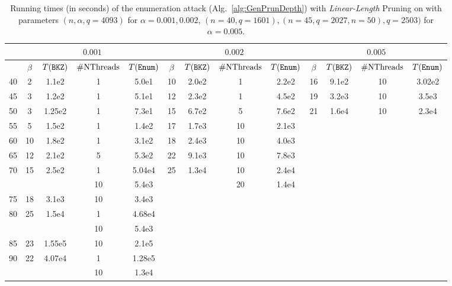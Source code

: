 \thispagestyle{empty} %
\begin{landscape}
\begin{table}
	\centering
	\begin{tabular}{|c|c|c|c|c|c|c|c|c|c|c|c||c|}
	
	\hline 
	\diagbox{$n$}{$\alpha$} & \multicolumn{4}{c|}{$0.001$} & \multicolumn{4}{c|}{$0.002$} & \multicolumn{4}{c|}{$0.005$} \\ \hline
	& $\beta$ & $T(\texttt{BKZ})$ & $\mathrm{\#NThreads}$ & $T(\texttt{Enum})$ & $\beta$ & $T(\texttt{BKZ})$ & $\mathrm{\#NThreads}$ & $T(\texttt{Enum})$ & $\beta$ & $T(\texttt{BKZ})$ & $\mathrm{\#NThreads}$ & $T(\texttt{Enum})$ \\ \hline
	40 & 2 & 1.1e2 & 1 & 5.0e1 & 
	     10& 2.0e2 & 1 & 2.2e2 & 
	     16& 9.1e2 & 10 & 3.02e2 \\ \hline
	45 & 3 & 1.2e2& 1 & 5.1e1 &
	     12 & 2.3e2& 1& 4.5e2 & 
	     19 & 3.2e3& 10 & 3.5e3 \\ \hline 
	50 & 3 & 1.25e2& 1 & 7.3e1& 
	     15& 6.7e2& 5 & 7.6e2& 
	     21& 1.6e4& 10& 2.3e4\\ \hline 
	55 & 5 & 1.5e2& 1 & 1.4e2& 
	     17& 1.7e3& 10 & 2.1e3& & & & \\ \hline 
	60 & 10 & 1.8e2& 1 & 3.1e2&
	     18 & 2.4e3 & 10& 4.0e3& & & & \\ \hline 
	65 & 12 & 2.1e2& 5 & 5.3e2&
	     22 & 9.1e3& 10& 7.8e3& & & & \\ \hline 
	\multirow{2}{*}{70} &\multirow{2}{*}{15} & \multirow{2}{*}{2.5e2} & 1 & 5.04e4& 
	\multirow{2}{*}{25} & \multirow{2}{*}{1.3e4}& 10 & 2.4e4 & & & & \\ \cline{4-5}\cline{8-13} 
	& & & 10 & 5.4e3 & 
	& &   20 & 1.4e4 & & & & \\ \hline 
	75 & 18 & 3.1e3 & 10 & 3.4e3 & & & & & & & & \\ \hline 
	\multirow{2}{*}{80} & \multirow{2}{*}{25} & \multirow{2}{*}{1.5e4} & 1 & 4.68e4& & & & & & & & \\ \cline{4-13} 
	& & & 10 & 5.4e3& & & & & & & & \\ \hline 
	85 & 23 & 1.55e5 & 10 & 2.1e5& & & & & & & & \\ \hline 
	\multirow{2}{*}{90} & \multirow{2}{*}{22} & \multirow{2}{*}{4.07e4} & 1 & 1.28e5& & & & & & & & \\ \cline{4-13} 
	& & & 10 & 1.3e4& & & & & & & & \\ \hline
	 


\end{tabular}
		\caption[Running times of the \BDD-decoding attack on standard \LWE parameters]{Running times (in seconds) of the enumeration attack (Alg.~\ref{alg:GenPrunDepth}) with \emph{Linear-Length} Pruning on \LWE with parameters $(n, \alpha, q=4093)$ for $\alpha=0.001, 0.002$, $(n=40, q=1601), (n=45, q=2027, n=50), q=2503)$ for $\alpha=0.005$.}
		\label{tabel:RunTimesLWE}
\end{table}
\end{landscape}